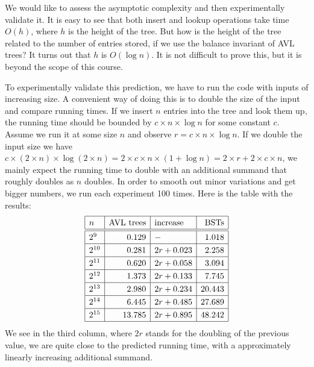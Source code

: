 We would like to assess the asymptotic complexity and then
experimentally validate it.  It is easy to see that both insert and
lookup operations take time $O(h)$, where $h$ is the height of the
tree.  But how is the height of the tree related to the number of
entries stored, if we use the balance invariant of AVL trees?  It
turns out that $h$ is $O(\log{n})$.  It is not difficult to
prove this, but it is beyond the scope of this course.

To experimentally validate this prediction, we have to run the code
with inputs of increasing size.  A convenient way of doing this is to
double the size of the input and compare running times.  If we insert
$n$ entries into the tree and look them up, the running time should
be bounded by $c \times n \times \log{n}$ for some constant $c$.
Assume we run it at some size $n$ and observe $r = c \times n \times
\log{n}$.  If we double the input size we have $c \times (2 \times n)
\times \log{(2 \times n)} = 2 \times c \times n \times (1+\log{n}) = 2
\times r + 2 \times c \times n$, we mainly expect the running time to
double with an additional summand that roughly doubles as $n$ doubles.
In order to smooth out minor variations and get bigger numbers, we run
each experiment 100 times.  Here is the table with the results:
\[\renewcommand{\arraystretch}{1.25}
\begin{array}{|l|r|l|r|}\hline
n & \mbox{AVL trees} & \mbox{increase} & \mbox{BSTs} \\ \hline\hline
2^9 & 0.129 & {-} & 1.018 \\ \hline
2^{10} & 0.281 & 2r+0.023 & 2.258 \\ \hline
2^{11} & 0.620 & 2r+0.058 & 3.094 \\ \hline
2^{12} & 1.373 & 2r+0.133 & 7.745 \\ \hline
2^{13} & 2.980 & 2r+0.234 & 20.443 \\ \hline
2^{14} & 6.445 & 2r+0.485 & 27.689 \\ \hline
2^{15} & 13.785 & 2r+0.895 & 48.242\\ \hline
\end{array}\]
We see in the third column, where $2r$ stands for the doubling of the
previous value, we are quite close to the predicted running time,
with a approximately linearly increasing additional summand.

